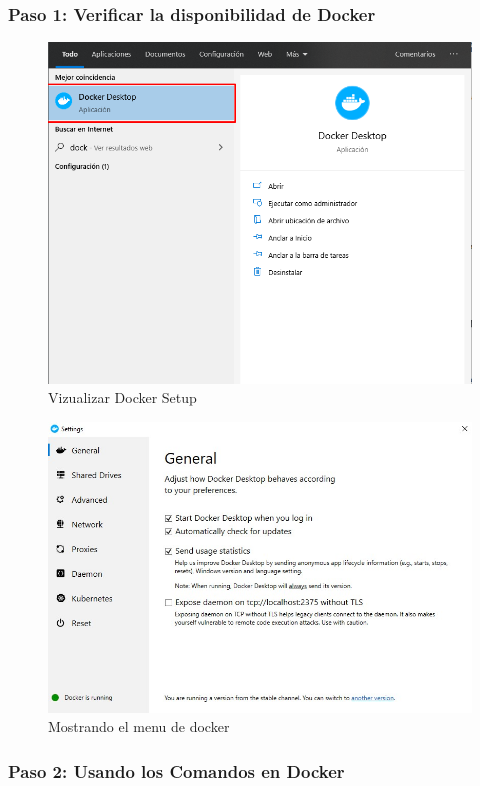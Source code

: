 \documentclass[preprint,12pt]{elsarticle}
\begin{document}
\subsubsection{\textbf{Paso 1: Verificar la disponibilidad de Docker}}
\begin{figure}[H]
	\begin{center}
		\includegraphics[width=12cm]{./IMAGENES/foto1} 
		\caption{Vizualizar Docker Setup}
	\end{center}
\end{figure}
\begin{figure}[H]
	\begin{center}
		\includegraphics[width=12cm]{./IMAGENES/foto4} 
		\caption{Mostrando el menu de docker}
	\end{center}
\end{figure}

\subsubsection{\textbf{Paso 2: Usando los Comandos en Docker}}
\end{document}
